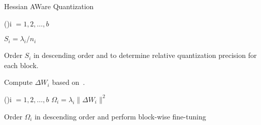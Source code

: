 \begin{algorithm}[t]
\DontPrintSemicolon
\caption{Hessian AWare Quantization}
\label{alg:hq}
    \SetAlgoLined

    \For(){i $=1,2,\ldots, b$}{

        $S_i = \lambda_i/n_i$ 
    }
    
    
    Order $S_i$ in descending order and to determine relative quantization precision for each block.
    
    Compute $\Delta W_i$ based on~.

    \For(\quad \quad \quad\quad\quad {}){i $=1,2,\ldots, b$}{
       $\Omega_i = \lambda_i\|\Delta W_i\|^2$ 
    }
    
    Order $\Omega_i$ in descending order and perform block-wise fine-tuning
\end{algorithm}



